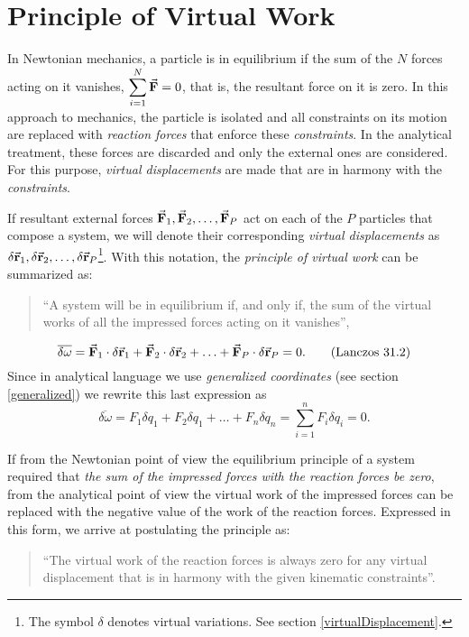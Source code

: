 \documentclass[12pt, spanish, a4paper, ]{article}
\begin{document}
\section{Principle of Virtual Work}\label{virtualWork} %
In Newtonian mechanics, a particle is in equilibrium if the sum of the \(N\) forces acting on it vanishes, \(\displaystyle\sum_{i=1}^N \va{F}= 0\), that is, the resultant force on it is zero.
In this approach to mechanics, the particle is isolated and all constraints on its motion are replaced with \emph{reaction forces} that enforce these \emph{constraints}.
In the analytical treatment, these forces are discarded and only the external ones are considered.
For this purpose, \emph{virtual displacements} are made that are in harmony with the \emph{constraints}.

If resultant external forces \(\va{F}_1, \va{F}_2, \ldots, \va{F}_P\) act on each of the \(P\) particles that compose a system, we will denote their corresponding \emph{virtual displacements} as \(\delta \va{r}_1, \delta \va{r}_2, \ldots, \delta \va{r}_P\)\footnote{The symbol \(\delta\) denotes virtual variations. See section \ref{virtualDisplacement}.}.
With this notation, the \emph{principle of virtual work} can be summarized as:
\begin{quote}
 ``A system will be in equilibrium if, and only if, the sum of the virtual works of all the impressed forces acting on it vanishes'',
\end{quote}
\begin{equation}\label{Lanczos31.2}
	\overline {\delta \omega} = 
	\va{F}_1 \cdot \delta \va{r}_1+ \va{F}_2 \cdot \delta \va{r}_2+ \ldots+ \va{F}_P \cdot \delta \va{r}_P = 0.
	\tag{Lanczos 31.2}
\end{equation}
Since in analytical language we use \emph{generalized coordinates} (see section \ref{generalized}) we rewrite this last expression as
\begin{equation}\label{Lanczos31.4}
	\overline {\delta \omega} = 
	F_1 \delta q_1+ F_2 \delta q_1+ \ldots + F_n \delta q_n = \sum_{i=1}^n F_i \delta q_i = 0. 
	\tag{Lanczos 31.4}
\end{equation}

If from the Newtonian point of view the equilibrium principle of a system required that \emph{the sum of the impressed forces with the reaction forces be zero}, from the analytical point of view the virtual work of the impressed forces can be replaced with the negative value of the work of the reaction forces.
Expressed in this form, we arrive at postulating the principle as:
\begin{quote} 
``The virtual work of the reaction forces is always zero for any virtual displacement that is in harmony with the given kinematic constraints''.
\end{quote} 
\end{document}
